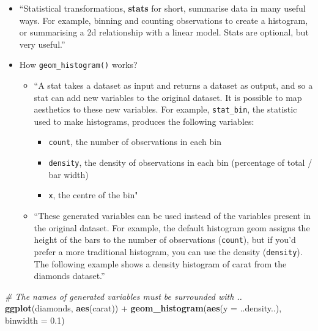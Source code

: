 \documentclass[]{book}
\newenvironment{Shaded}{\begin{snugshade}}{\end{snugshade}}
\newcommand{\KeywordTok}[1]{\textcolor[rgb]{0.13,0.29,0.53}{\textbf{{#1}}}}
\newcommand{\DataTypeTok}[1]{\textcolor[rgb]{0.13,0.29,0.53}{{#1}}}
\newcommand{\FloatTok}[1]{\textcolor[rgb]{0.00,0.00,0.81}{{#1}}}
\newcommand{\StringTok}[1]{\textcolor[rgb]{0.31,0.60,0.02}{{#1}}}
\newcommand{\CommentTok}[1]{\textcolor[rgb]{0.56,0.35,0.01}{\textit{{#1}}}}
\newcommand{\NormalTok}[1]{{#1}}
\providecommand{\tightlist}{%
  \setlength{\itemsep}{0pt}\setlength{\parskip}{0pt}}
\begin{document}
\begin{itemize}
\item
  ``Statistical transformations, \textbf{stats} for short, summarise
  data in many useful ways. For example, binning and counting
  observations to create a histogram, or summarising a 2d relationship
  with a linear model. Stats are optional, but very useful.''
  \citep{ggplot2}
\item
  How \texttt{geom\_histogram()} works?

  \begin{itemize}
  \tightlist
  \item
    ``A stat takes a dataset as input and returns a dataset as output,
    and so a stat can add new variables to the original dataset. It is
    possible to map aesthetics to these new variables. For example,
    \texttt{stat\_bin}, the statistic used to make histograms, produces
    the following variables:

    \begin{itemize}
    \tightlist
    \item
      \texttt{count}, the number of observations in each bin
    \item
      \texttt{density}, the density of observations in each bin
      (percentage of total / bar width)
    \item
      \texttt{x}, the centre of the bin" \citep{ggplot2}
    \end{itemize}
  \item
    ``These generated variables can be used instead of the variables
    present in the original dataset. For example, the default histogram
    geom assigns the height of the bars to the number of observations
    (\texttt{count}), but if you'd prefer a more traditional histogram,
    you can use the density (\texttt{density}). The following example
    shows a density histogram of carat from the diamonds dataset.''
    \citep{ggplot2}
  \end{itemize}
\end{itemize}

\begin{Shaded}
\begin{Highlighting}[]
\CommentTok{# The names of generated variables must be surrounded with ..}
 \KeywordTok{ggplot}\NormalTok{(diamonds, }\KeywordTok{aes}\NormalTok{(carat)) +}\StringTok{ }\KeywordTok{geom_histogram}\NormalTok{(}\KeywordTok{aes}\NormalTok{(}\DataTypeTok{y =} \NormalTok{..density..), }\DataTypeTok{binwidth =} \FloatTok{0.1}\NormalTok{)}
\end{Highlighting}
\end{Shaded}
\end{document}
